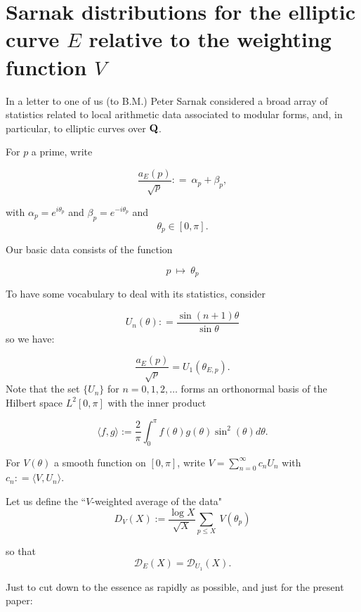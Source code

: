 \documentclass[11pt]{article}
\theoremstyle{plain}
\theoremstyle{definition}
\numberwithin{equation}{section}
\numberwithin{figure}{section}
\numberwithin{table}{section}
\def\Q{\bf{Q}}
\begin{document}
 \section{\bf Sarnak distributions for the elliptic curve $E$ relative to the weighting function $V$}

  In a letter  \cite{S}  to one of us (to B.M.) Peter Sarnak considered a broad array of statistics related to local arithmetic data associated to modular forms,  and, in particular, to elliptic curves over ${\Q}$.


For $p$ a prime, write

\begin{equation}
{\frac{a_E(p)}{\sqrt p}}: = \   \alpha_p+\beta_p,
\end{equation}

with $\alpha_p= e^{i\theta_p}$ and  $\beta_p= e^{-i\theta_p}$
and
\begin{equation}
  \theta_p \in [0, \pi].
\end{equation}


Our basic data consists of the function

\begin{equation}\label{data}
p \ \mapsto\ \theta_p
\end{equation}

To have some vocabulary to deal with its statistics, consider

$$U_n(\theta) : = {\frac {\sin(n+1)\theta}{\sin\theta}}$$  so we have:

  $$\frac{a_E(p)}{\sqrt p} = U_1(\theta_{E,p}).$$  Note that the set $\{U_n\}$ for $n=0,1,2,\dots$ forms an orthonormal basis of the Hilbert space $L^2[0,\pi]$  with the
 inner product

 $$\langle f, g\rangle :={\frac{2}{\pi}} \int_0^\pi f(\theta)g(\theta)\sin^2(\theta)d\theta.$$

For $V(\theta)$ a smooth function on $[0,\pi]$, write $V=\sum_{n=0}^{\infty} c_nU_n$ with $c_n: = \langle V, U_n\rangle$.

Let us define the ``$V$-weighted average of the data"
\begin{equation}
D_V(X):= {\frac{\log X}{\sqrt X}}\sum_{p \le X} \ V(\theta_p)
\end{equation}


 so that   $${\mathcal D}_E(X)=  {\mathcal D}_{U_1}(X).$$


Just to cut down to the essence as rapidly as possible, and just for the present paper:
\end{document}
